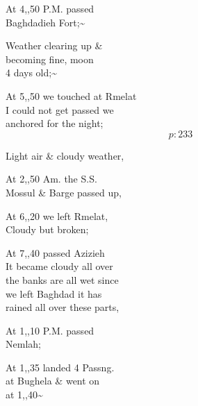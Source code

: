 \documentclass{report}
\begin{document}
	\par{
 	At 4,,50 P.M. passed\ \\Baghdadieh Fort;\~{}\ \\
	}

	\par{
 	Weather clearing up \&\ \\becoming fine, moon\ \\4 days old;\~{}\ \\
	}

	\par{
 	At 5,,50 we touched at Rmelat\ \\I could not get passed we\ \\anchored for the night;\ \\
  \[p: 233 \]

	}



	\par{
 	Light air \& cloudy weather,\ \\
	}

	\par{
 	At 2,,50 Am. the S.S.\ \\Mossul \& Barge passed up,\ \\
	}

	\par{
 	At 6,,20 we left Rmelat,\ \\Cloudy but broken;\ \\
	}

	\par{
 	At 7,,40 passed Azizieh\ \\It became cloudy all over\ \\the banks are all wet since\ \\we left Baghdad it has\ \\rained all over these parts,\ \\
	}

	\par{
 	At 1,,10 P.M. passed\ \\Nemlah;\ \\
	}

	\par{
 	At 1,,35 landed 4 Passng.\ \\at Bughela \& went on\ \\at 1,,40\~{}\ \\
	}
\end{document}
